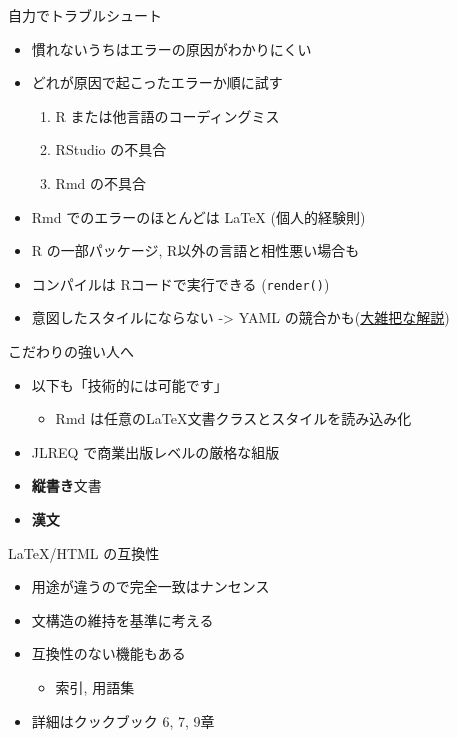 \documentclass[
  ignorenonframetext,
]{beamer}
\providecommand{\tightlist}{%
  \setlength{\itemsep}{0pt}\setlength{\parskip}{0pt}}
\begin{document}
\begin{frame}[fragile]{自力でトラブルシュート}
\protect\hypertarget{ux81eaux529bux3067ux30c8ux30e9ux30d6ux30ebux30b7ux30e5ux30fcux30c8}{}
\begin{itemize}
\item
  慣れないうちはエラーの原因がわかりにくい
\item
  どれが原因で起こったエラーか順に試す

  \begin{enumerate}
  \tightlist
  \item
    R または他言語のコーディングミス
  \item
    RStudio の不具合
  \item
    Rmd の不具合
  \end{enumerate}
\item
  Rmd でのエラーのほとんどは LaTeX (個人的経験則)
\item
  R の一部パッケージ, R以外の言語と相性悪い場合も
\item
  コンパイルは Rコードで実行できる (\texttt{render()})
\item
  意図したスタイルにならない -\textgreater{} YAML
  の競合かも(\href{https://ill-identified.hatenablog.com/entry/2020/09/05/202403}{大雑把な解説})
\end{itemize}
\end{frame}

\begin{frame}{こだわりの強い人へ}
\protect\hypertarget{ux3053ux3060ux308fux308aux306eux5f37ux3044ux4ebaux3078}{}
\begin{itemize}
\item
  以下も「技術的には可能です」

  \begin{itemize}
  \tightlist
  \item
    Rmd は任意のLaTeX文書クラスとスタイルを読み込み化
  \end{itemize}
\item
  JLREQ で商業出版レベルの厳格な組版
\item
  \textbf{縦書き}文書
\item
  \textbf{漢文}
\end{itemize}
\end{frame}

\begin{frame}{LaTeX/HTML の互換性}
\protect\hypertarget{latexhtml-ux306eux4e92ux63dbux6027}{}
\begin{itemize}
\item
  用途が違うので完全一致はナンセンス
\item
  文構造の維持を基準に考える
\item
  互換性のない機能もある

  \begin{itemize}
  \tightlist
  \item
    索引, 用語集
  \end{itemize}
\item
  詳細はクックブック\autocite{xie2020Markdowna} 6, 7, 9章
\end{itemize}
\end{frame}
\end{document}
